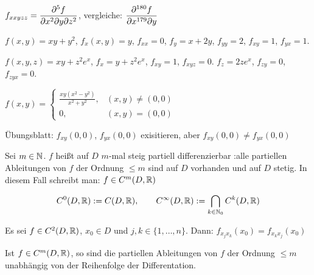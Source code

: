 \documentclass[a4paper,twoside,DIV15,BCOR12mm,chapterprefix=true,headings=twolinechapter]{scrbook}
\begin{document}
\begin{schreibweisen}
$\displaystyle f_{xxyzz} = \frac{\partial^5 f}{\partial x^2\partial y\partial z^2}$, vergleiche: $\displaystyle\frac{\partial^{180} f}{\partial x^{179}\partial y}$
\end{schreibweisen}

\begin{beispiele}
\item $f(x,y) = xy + y^2$, $f_x(x,y)=y$, $f_{xx} = 0$, $f_y = x + 2y$, $f_{yy} = 2$, $f_{xy}=1$, $f_{yx} = 1$.
\item $f(x,y,z) = xy + z^2e^x$, $f_x = y+z^2e^x$, $f_{xy} = 1$, $f_{xyz} = 0$. $f_z=2ze^x$, $f_{zy}=0$, $f_{zyx} = 0$.
\item $f(x,y) = \begin{cases} \frac{xy(x^2-y^2)}{x^2+y^2}, & (x,y) \ne (0,0) \\ 0, &(x,y)=(0,0)\end{cases}$

Übungsblatt: $f_{xy}(0,0)$, $f_{yx}(0,0)$ exisitieren, aber $f_{xy}(0,0) \ne f_{yx}(0,0)$
\end{beispiele}

\begin{definition}
Sei $m\in\mathbb{N}$. $f$ heißt auf $D$ $m$-mal steig partiell differenzierbar :\equizu alle partiellen Ableitungen  von $f$ der Ordnung $\le m$ sind auf $D$ vorhanden und auf $D$ stetig. In diesem Fall schreibt man: $f\in C^m(D,\mathbb{R})$

$$C^0(D, \mathbb{R}) := C(D,\mathbb{R}),\qquad C^\infty(D,\mathbb{R}) := \bigcap_{k\in\mathbb{N}_0}C^{k}(D,\mathbb{R})$$
\end{definition}

\begin{satz}
Es sei $f\in C^2(D,\mathbb{R})$, $x_0\in D$ und $j,k\in\{1,\ldots,n\}$. Dann: $f_{x_jx_k}(x_0) = f_{x_kx_j}(x_0)$
\end{satz}

\begin{satz}[Folgerung]
Ist $f\in C^m(D,\mathbb{R})$, so sind die partiellen Ableitungen von $f$ der Ordnung $\le m$ unabhängig von der Reihenfolge der Differentation.
\end{satz}
\end{document}
